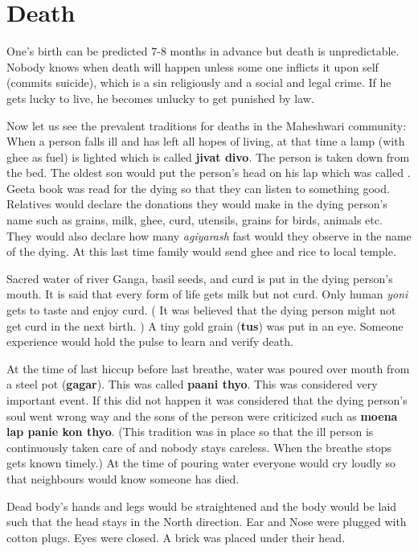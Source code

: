 \section{Death} 
One's birth can be predicted 7-8 months in advance but death is unpredictable.
Nobody knows when death will happen unless some one inflicts it upon self
(commits suicide), which is a sin religiously and a social and legal crime. If
he gets lucky to live, he becomes unlucky to get punished by law.

Now let us see the prevalent traditions for deaths in the Maheshwari community:
When a person falls ill and has left all hopes of living, at that time a lamp
(with ghee as fuel) is lighted which is called \textbf{jivat divo}. The person
is taken down from the bed. The oldest son would put the person's head on his
lap which was called . Geeta book was read for the dying so
that they can listen to something good. Relatives would declare the donations
they would make in the dying person's name such as grains, milk, ghee, curd,
utensils, grains for birds, animals etc. They would also declare how many
\textit{agiyarash} fast would they observe in the name of the dying. At this
last time family would send ghee and rice to local temple.

Sacred water of river Ganga, basil seeds, and curd is put in the dying person's
mouth. It is said that every form of life gets milk but not curd. Only human
\textit{yoni} gets to taste and enjoy curd. ( It was believed that the dying
person might not get curd in the next birth. ) A tiny gold grain (\textbf{tus})
was put in an eye. Someone experience would hold the pulse to learn and verify
death.

At the time of last hiccup before last breathe, water was poured over mouth
from a steel pot (\textbf{gagar}). This was called \textbf{paani thyo}. This
was considered very important event. If  this did not happen it was considered
that the dying person's soul went wrong way and the sons of the person were
criticized such as \textbf{moena lap panie kon thyo}. (This tradition was in
place so that the ill person is continuously taken care of and nobody stays
careless. When the breathe stops gets known timely.) At the time of pouring
water everyone would cry loudly so that neighbours would know someone has died.

Dead body's hands and legs would be straightened and the body would be laid
such that the head stays in the North direction. Ear and Nose were plugged with
cotton plugs. Eyes were closed. A brick was placed under their head.

